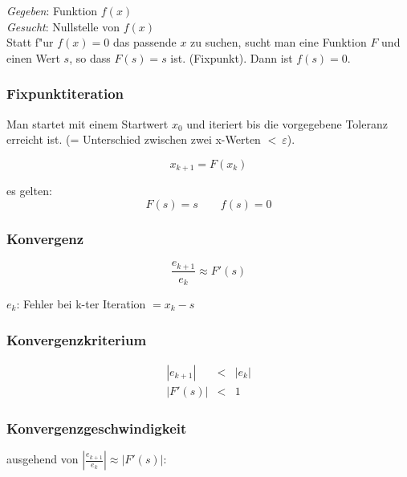 \documentclass[german, 10pt, a4paper, twocolumn]{scrartcl}
\begin{document}
\textit{Gegeben}: Funktion $f(x)$\\
\textit{Gesucht}: Nullstelle von $f(x)$\\

Statt f"ur $f(x)=0$ das passende $x$ zu suchen, sucht man eine Funktion $F$ und einen Wert $s$, so dass $F(s)=s$ ist. (Fixpunkt). Dann ist $f(s)=0$.\\

\subsubsection{Fixpunktiteration}

Man startet mit einem Startwert $x_0$ und iteriert bis die vorgegebene Toleranz erreicht ist. (= Unterschied zwischen zwei x-Werten $<\: \varepsilon$).

\begin{displaymath}
	x_{k+1} = F(x_k)
\end{displaymath}

es gelten:
\begin{displaymath}
	F(s) = s	\qquad		f(s)=0
\end{displaymath}

\subsubsection{Konvergenz}

\begin{displaymath}
	\frac{e_{k+1}}{e_k} \approx F'(s)
\end{displaymath}

$e_k$: Fehler bei k-ter Iteration $=x_k-s$

\subsubsection{Konvergenzkriterium}

\begin{eqnarray}
	| e_{k+1} | &		< &		|e_k| \nonumber \\
	| F'(s) | &		< &		1 \nonumber
\end{eqnarray}

\subsubsection{Konvergenzgeschwindigkeit}

ausgehend von $|\frac{e_{k+1}}{e_k}|\approx |F'(s)|$:
\end{document}
